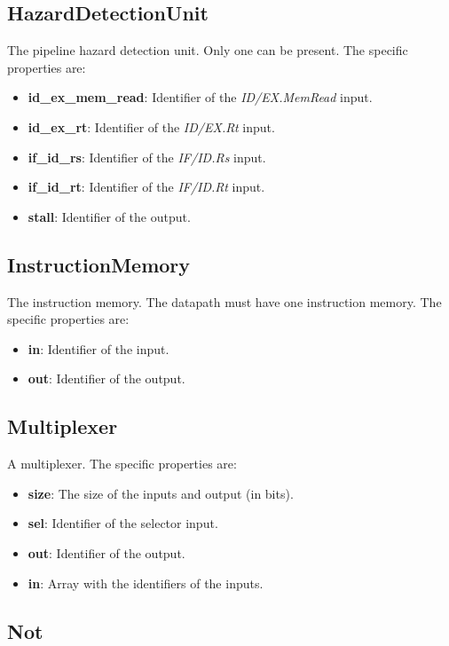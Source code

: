 \documentclass[11pt,a4paper,twoside,titlepage]{report}
\begin{document}
\subsection{HazardDetectionUnit}

The pipeline hazard detection unit. Only one can be present.
The specific properties are:
\begin{itemize}
	\item \textbf{id\_ex\_mem\_read}: Identifier of the \emph{ID/EX.MemRead} input.
	\item \textbf{id\_ex\_rt}: Identifier of the \emph{ID/EX.Rt} input.
	\item \textbf{if\_id\_rs}: Identifier of the \emph{IF/ID.Rs} input.
	\item \textbf{if\_id\_rt}: Identifier of the \emph{IF/ID.Rt} input.
	\item \textbf{stall}: Identifier of the output.
\end{itemize}

\subsection{InstructionMemory}

The instruction memory. The datapath must have one instruction memory.
The specific properties are:
\begin{itemize}
	\item \textbf{in}: Identifier of the input.
	\item \textbf{out}: Identifier of the output.
\end{itemize}

\subsection{Multiplexer}

A multiplexer. The specific properties are:
\begin{itemize}
	\item \textbf{size}: The size of the inputs and output (in bits).
	\item \textbf{sel}: Identifier of the selector input.
	\item \textbf{out}: Identifier of the output.
	\item \textbf{in}: Array with the identifiers of the inputs.
\end{itemize}

\subsection{Not}
\end{document}
